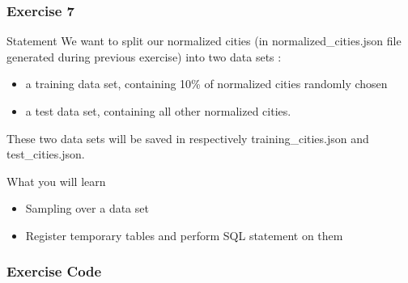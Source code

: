\documentclass[slidetop,9pt,utf8]{beamer}
\begin{document}
\begin{frame}
  \frametitle{Exercise 7}

  \begin{block}{Statement}
    We want to split our normalized cities (in normalized\_cities.json file generated during previous exercise) into two data sets : 
    \begin{itemize}
      \item a training data set, containing 10\% of normalized cities randomly chosen
      \item a test data set, containing all other normalized cities. 
    \end{itemize}
    
    These two data sets will be saved in respectively training\_cities.json and test\_cities.json.
  \end{block}

  \begin{block}{What you will learn}
    \begin{itemize}
      \item Sampling over a data set
      \item Register temporary tables and perform SQL statement on them
    \end{itemize}
  \end{block}

\end{frame}

\begin{frame}
  \frametitle{Exercise Code}

  

\end{frame}
\end{document}
